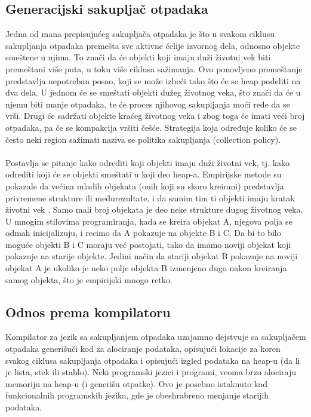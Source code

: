 \subsection{Generacijski sakupljač otpadaka}
Jedna od mana prepisujućeg sakupljača otpadaka je što u svakom ciklusu
sakupljanja otpadaka premešta sve aktivne ćelije izvornog dela, odnosno objekte smeštene u njima.
To znači da će objekti koji imaju duži životni vek biti premeštani više puta, u toku više ciklusa sažimanja.
Ovo ponovljeno premeštanje predstavlja nepotreban posao, koji se može izbeći tako što će se heap podeliti na dva dela.
U jednom će se smeštati objekti dužeg životnog veka, što znači da će u njemu biti manje otpadaka, te će proces njihovog sakupljanja moći ređe da se vrši.
Drugi će sadržati objekte kraćeg životnog veka i zbog toga će imati veći broj otpadaka, pa će se kompakcija vršiti češće.
Strategija koja određuje koliko će se često neki region sažimati naziva se politika sakupljanja (collection policy).
\\
\\
Postavlja se pitanje kako odrediti koji objekti imaju duži životni vek, tj. kako odrediti koji će se objekti smeštati u koji deo heap-a. 
Empirijske metode su pokazale da većina mladih objekata (onih koji su skoro kreirani) predstavlja privremene strukture ili međurezultate, i da samim tim ti objekti imaju kratak životni vek \cite{app87}.
Samo mali broj objekata je deo neke strukture dugog životnog veka.
U mnogim stilovima programiranja, kada se kreira objekat A, njegova polja se odmah inicijalizuju, i recimo da A pokazuje na objekte B i C.
Da bi to bilo moguće objekti B i C moraju već postojati, tako da imamo noviji objekat koji pokazuje na starije objekte.
Jedini način da stariji objekat B pokazuje na noviji objekat A je ukoliko je neko polje objekta B izmenjeno dugo nakon kreiranja samog objekta, što je empirijski mnogo retko.

\subsection{Odnos prema kompilatoru}

Kompilator za jezik sa sakupljanjem otpadaka uzajamno dejstvuje sa sakupljačem otpadaka generišući kod za alociranje podataka, opisujući lokacije za koren svakog ciklusa sakupljanja otpadaka i opisujući izgled podataka na heap-u (da li je lista, stek ili stablo).
Neki programski jezici i programi, veoma brzo alociraju memoriju na heap-u (i generišu otpatke).
Ovo je posebno istaknuto kod funkcionalnih programskih jezika, gde je obeshrabreno menjanje starijih podataka.



